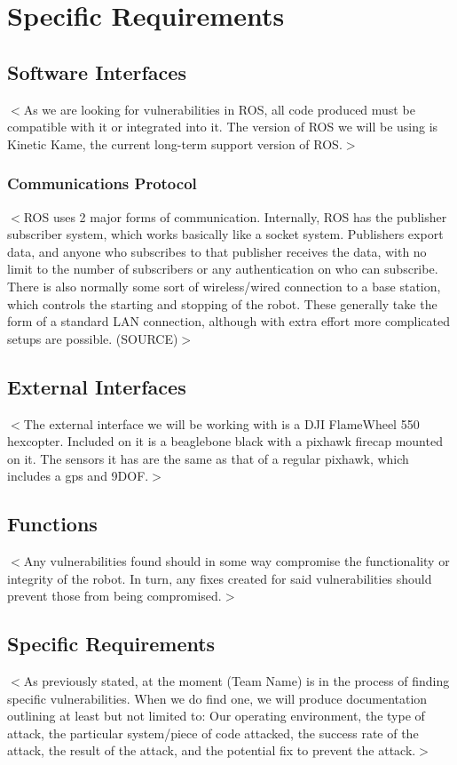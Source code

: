 \documentclass{scrreprt}
\begin{document}
\chapter{Specific Requirements}

\section{Software Interfaces}
$<$As we are looking for vulnerabilities in ROS, all code produced must be compatible with it or integrated into it. The version of ROS we will be using is Kinetic Kame, the current long-term support version of ROS.$>$

\subsection{Communications Protocol}
$<$ROS uses 2 major forms of communication. Internally, ROS has the publisher subscriber system, which works basically like a socket system.
Publishers export data, and anyone who subscribes to that publisher receives the data, with no limit to the number of
subscribers or any authentication on who can subscribe. There is also normally some sort of wireless/wired connection to a base
station, which controls the starting and stopping of the robot. These generally take the form of a standard LAN connection,
although with extra effort more complicated setups are possible. (SOURCE)$>$

\section{External Interfaces}
$<$The external interface we will be working with is a DJI FlameWheel 550 hexcopter.
Included on it is a beaglebone black with a pixhawk firecap mounted on it.
The sensors it has are the same as that of a regular pixhawk, which includes a gps and 9DOF.$>$

\section{Functions}
$<$Any vulnerabilities found should in some way compromise the functionality or integrity of the robot. In turn, any fixes created for said vulnerabilities should prevent those from being compromised.$>$

\section{Specific Requirements}
$<$As previously stated, at the moment (Team Name) is in the process of finding specific vulnerabilities. When we do find one, we will produce documentation outlining at least but not limited to:
Our operating environment, the type of attack, the particular system/piece of code attacked, the success rate of the attack, the result of the attack, and the potential fix to prevent the attack.$>$
\end{document}
